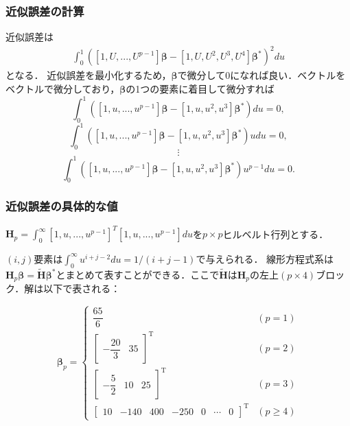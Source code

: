 \documentclass[dvipdfmx,cjk]{beamer}
\theoremstyle{example}
\begin{document}
\begin{frame}
    \frametitle{近似誤差の計算}
    近似誤差は
    \begin{align*}
        \int_{0}^{1}\left([1, U, ..., U^{p-1}]\boldsymbol{\beta}-[1, U, U^2,U^3,U^4]\boldsymbol{\beta}^*\right)^2 du
    \end{align*}
    となる．
    近似誤差を最小化するため，$\boldsymbol{\beta}$で微分して$0$になれば良い．ベクトルをベクトルで微分しており，$\boldsymbol{\beta}$の1つの要素に着目して微分すれば
    $$\int_0^{1} ([1, u, ..., u^{p-1}] \boldsymbol{\beta} - [1, u, u^2, u^3] \boldsymbol{\beta}^*) du = 0,$$
    $$\int_0^{1} ([1, u, ..., u^{p-1}] \boldsymbol{\beta} - [1, u, u^2, u^3] \boldsymbol{\beta}^*) u du = 0,$$
    $$\vdots$$
    $$\int_0^{1} ([1, u, ..., u^{p-1}]\boldsymbol{\beta} - [1, u, u^2, u^3] \boldsymbol{\beta}^*) u^{p-1} du = 0.$$


\end{frame}

\begin{frame}
    \frametitle{近似誤差の具体的な値}
    $\mathbf{H}_p = \int_0^{\infty} [1, u, ..., u^{p-1}]^T [1, u, ..., u^{p-1}] du$を$p \times p$ヒルベルト行列とする．

    $(i,j)$要素は$\int_0^{\infty} u^{i+j-2} du = 1/(i+j-1)$で与えられる．
    線形方程式系は$\mathbf{H}_p \boldsymbol{\beta} = \tilde{\mathbf{H}}\boldsymbol{\beta}^*$とまとめて表すことができる．ここで$\tilde{\mathbf{H}}$は$\mathbf{H}_p$の左上$(p \times 4)$ブロック．解は以下で表される：

    \[
        \boldsymbol{\beta}_p =
        \left\{
        \begin{array}{ll}
            \dfrac{65}{6}                                                                      & (p = 1)    \\[2ex]
            \begin{bmatrix} -\dfrac{20}{3}  & 35 \end{bmatrix}^{\mathrm{T}}                    & (p = 2)    \\[3ex]
            \begin{bmatrix} -\dfrac{5}{2} & 10 & 25 \end{bmatrix}^{\mathrm{T}}                 & (p = 3)    \\[3ex]
            \begin{bmatrix} 10 & -140 & 400 & -250 & 0 & \cdots & 0 \end{bmatrix}^{\mathrm{T}} & (p \geq 4)
        \end{array}
        \right.
        \tag{2.18}
    \]
\end{frame}
\end{document}
